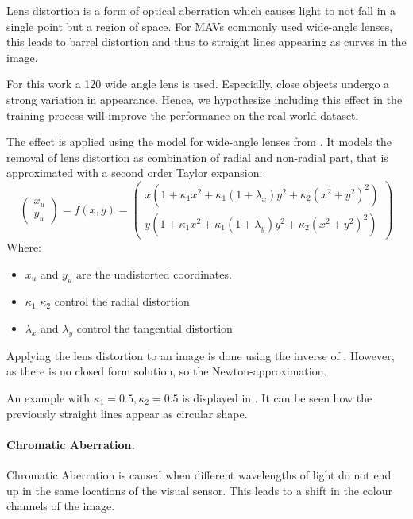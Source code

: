 Lens distortion is a form of optical aberration which causes light to not fall in a single point but a region of space. For \acp{MAV} commonly used wide-angle lenses, this leads to barrel distortion and thus to straight lines appearing as curves in the image.

For this work a 120 wide angle lens is used. Especially, close objects undergo a strong variation in appearance. Hence, we hypothesize including this effect in the training process will improve the performance on the real world dataset. 

The effect is applied using the model for wide-angle lenses from \cite{Vass}. It models the removal of lens distortion as combination of radial and non-radial part, that is approximated with a second order Taylor expansion:
\begin{equation}
\begin{pmatrix}
x_u \\
y_u  
\end{pmatrix}=
f(x,y) =
\begin{pmatrix}
x (1 + \kappa_1 x^2 + \kappa_1 (1 + \lambda_x) y^2 + \kappa_2(x^2 + y^2)^2) \\
y (1 + \kappa_1 x^2 + \kappa_1 (1 + \lambda_y) y^2 + \kappa_2(x^2 + y^2)^2)
\end{pmatrix} 
\label{eq:distortion}
\end{equation}
Where:
\begin{itemize}
	\item $x_u$ and $y_u$ are the undistorted coordinates.
	\item $\kappa_1$ $\kappa_2$ control the radial distortion 
	\item $\lambda_x$ and $\lambda_y$ control the tangential distortion
\end{itemize}

Applying the lens distortion to an image is done using the inverse of . However, as there is no closed form solution, so the Newton-approximation.

An example with $\kappa_1 = 0.5, \kappa_2 = 0.5$ is displayed in . It can be seen how the previously straight lines appear as circular shape.

\paragraph{Chromatic Aberration.}

Chromatic Aberration is caused when different wavelengths of light do not end up in the same locations of the visual sensor. This leads to a shift in the colour channels of the image.


